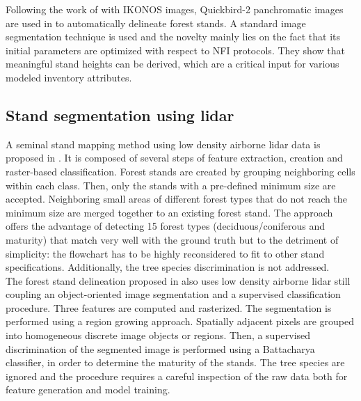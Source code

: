 Following the work of \citep{Wulder2008} with IKONOS images, Quickbird-2 panchromatic images are used in \citep{Mora20102474} to automatically delineate forest stands. A standard image segmentation technique is used and the novelty mainly lies on the fact that its initial parameters are optimized with respect to NFI protocols. They show that meaningful stand heights can be derived, which are a critical input for various modeled inventory attributes.\\

\subsection{Stand segmentation using lidar}
A seminal stand mapping method using low density airborne lidar data is proposed in \citep{koch2009airborne}. It is composed of several steps of feature extraction, creation and raster-based classification. Forest stands are created by grouping neighboring cells within each class. Then, only the stands with a pre-defined minimum size are accepted. Neighboring small areas of different forest types that do not reach the minimum size are merged together to an existing forest stand. The approach offers the advantage of detecting 15 forest types (deciduous/coniferous and maturity) that match very well with the ground truth but to the detriment of simplicity: the flowchart has to be highly reconsidered to fit to other stand specifications. Additionally, the tree species discrimination is not addressed.\\

The forest stand delineation proposed in \citep{sullivan2009object} also uses low density airborne lidar still coupling an object-oriented image segmentation and a supervised classification procedure. Three features are computed and rasterized. The segmentation is performed using a region growing approach. Spatially adjacent pixels are grouped into homogeneous discrete image objects or regions. Then, a supervised discrimination of the segmented image is performed using a Battacharya classifier, in order to determine the maturity of the stands. The tree species are ignored and the procedure requires a careful inspection of the raw data both for feature generation and model training. \\

